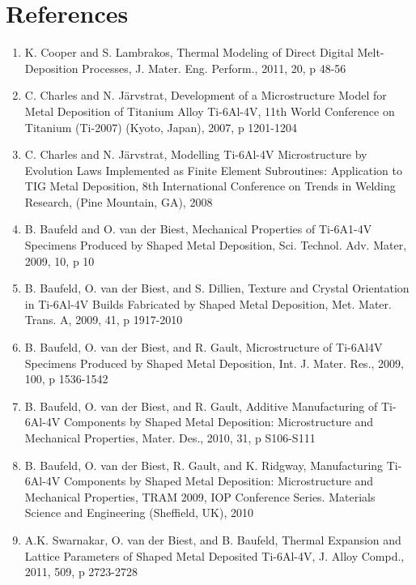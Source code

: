 \documentclass[10pt]{article}
\begin{document}
\section*{References}
\begin{enumerate}
  \item K. Cooper and S. Lambrakos, Thermal Modeling of Direct Digital Melt-Deposition Processes, J. Mater. Eng. Perform., 2011, 20, p 48-56

  \item C. Charles and N. Järvstrat, Development of a Microstructure Model for Metal Deposition of Titanium Alloy Ti-6Al-4V, 11th World Conference on Titanium (Ti-2007) (Kyoto, Japan), 2007, p 1201-1204

  \item C. Charles and N. Järvstrat, Modelling Ti-6Al-4V Microstructure by Evolution Laws Implemented as Finite Element Subroutines: Application to TIG Metal Deposition, 8th International Conference on Trends in Welding Research, (Pine Mountain, GA), 2008

  \item B. Baufeld and O. van der Biest, Mechanical Properties of Ti-6A1-4V Specimens Produced by Shaped Metal Deposition, Sci. Technol. Adv. Mater, 2009, 10, p 10

  \item B. Baufeld, O. van der Biest, and S. Dillien, Texture and Crystal Orientation in Ti-6Al-4V Builds Fabricated by Shaped Metal Deposition, Met. Mater. Trans. A, 2009, 41, p 1917-2010

  \item B. Baufeld, O. van der Biest, and R. Gault, Microstructure of Ti-6Al4V Specimens Produced by Shaped Metal Deposition, Int. J. Mater. Res., 2009, 100, p 1536-1542

  \item B. Baufeld, O. van der Biest, and R. Gault, Additive Manufacturing of Ti-6Al-4V Components by Shaped Metal Deposition: Microstructure and Mechanical Properties, Mater. Des., 2010, 31, p S106-S111

  \item B. Baufeld, O. van der Biest, R. Gault, and K. Ridgway, Manufacturing Ti-6Al-4V Components by Shaped Metal Deposition: Microstructure and Mechanical Properties, TRAM 2009, IOP Conference Series. Materials Science and Engineering (Sheffield, UK), 2010

  \item A.K. Swarnakar, O. van der Biest, and B. Baufeld, Thermal Expansion and Lattice Parameters of Shaped Metal Deposited Ti-6Al-4V, J. Alloy Compd., 2011, 509, p 2723-2728


\end{enumerate}
\end{document}
